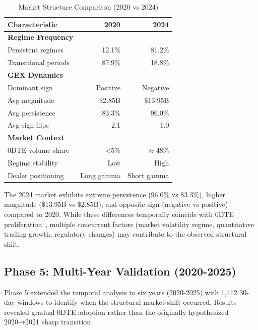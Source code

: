 \begin{table}[ht]
\centering
\caption{Market Structure Comparison (2020 vs 2024)}
\begin{tabular}{lrr}
\toprule
\textbf{Characteristic} & \textbf{2020} & \textbf{2024} \\
\midrule
\textbf{Regime Frequency} & & \\
\quad Persistent regimes & 12.1\% & 81.2\% \\
\quad Transitional periods & 87.9\% & 18.8\% \\
\midrule
\textbf{GEX Dynamics} & & \\
\quad Dominant sign & Positive & Negative \\
\quad Avg magnitude & \$2.85B & \$13.95B \\
\quad Avg persistence & 83.3\% & 96.0\% \\
\quad Avg sign flips & 2.1 & 1.0 \\
\midrule
\textbf{Market Context} & & \\
\quad 0DTE volume share & <5\% & $\approx$48\% \\
\quad Regime stability & Low & High \\
\quad Dealer positioning & Long gamma & Short gamma \\
\bottomrule
\end{tabular}
\end{table}

The 2024 market exhibits extreme persistence (96.0\% vs 83.3\%), higher magnitude (\$13.95B vs \$2.85B), and opposite sign (negative vs positive) compared to 2020. While these differences temporally coincide with 0DTE proliferation~\citep{cboe2024zero,dim2025zero}, multiple concurrent factors (market volatility regime, quantitative trading growth, regulatory changes) may contribute to the observed structural shift.

\subsection{Phase 5: Multi-Year Validation (2020-2025)}
\label{sec:phase5}

\vspace{0.2cm}

Phase 5 extended the temporal analysis to six years (2020-2025) with 1,412 30-day windows to identify when the structural market shift occurred. Results revealed gradual 0DTE adoption rather than the originally hypothesized 2020→2021 sharp transition.

